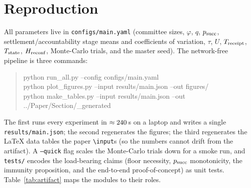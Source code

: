 \appendices

\section{Reproduction}
\label{app:repro}

All parameters live in \texttt{configs/main.yaml} (committee sizes, $\varphi$, $q$, $p_{\mathrm{succ}}$,
settlement/accountability stage means and coefficients of variation, $\tau$, $U$, $T_{\mathrm{receipt}}$,
$T_{\mathrm{state}}$, $H_{\mathrm{reconf}}$, Monte-Carlo trials, and the master seed). The network-free pipeline is three
commands:
\begin{quote}\small\ttfamily
python run\_all.py --config configs/main.yaml\\
python plot\_figures.py --input results/main.json --out figures/\\
python make\_tables.py --input results/main.json --out ../Paper/Section/\_generated
\end{quote}
The first runs every experiment in $\approx240$\,s on a laptop and writes a single
\texttt{results/main.json}; the second regenerates the figures; the third regenerates the \LaTeX{}
data tables the paper \texttt{\textbackslash input}s (so the numbers cannot drift from the artifact).
A \texttt{--quick} flag scales the Monte-Carlo trials down for a smoke run, and \texttt{tests/} encodes
the load-bearing claims (floor necessity, $p_{\mathrm{succ}}$ monotonicity, the immunity proposition, and the
end-to-end proof-of-concept) as unit tests. Table~\ref{tab:artifact} maps the modules to their roles.

